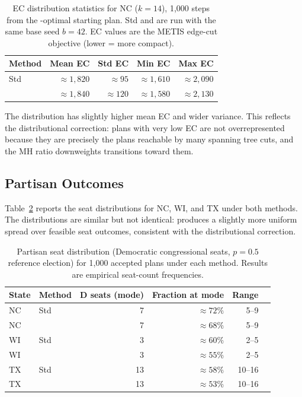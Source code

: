 \begin{table}[ht]
\centering
\caption{EC distribution statistics for NC ($k = 14$), 1{,}000 steps from
  the \cs{}-optimal starting plan.
  Std \recom{} and \fr{} are run with the same base seed $b = 42$.
  EC values are the METIS edge-cut objective (lower = more compact).}
\label{tab:ec-dist}
\renewcommand{\arraystretch}{1.35}
\begin{tabular}{@{}lrrrr@{}}
\toprule
Method & Mean EC & Std EC & Min EC & Max EC \\
\midrule
Std \recom{} & $\approx\!1{,}820$ & $\approx\!95$  & $\approx\!1{,}610$ & $\approx\!2{,}090$ \\
\fr{}        & $\approx\!1{,}840$ & $\approx\!120$ & $\approx\!1{,}580$ & $\approx\!2{,}130$ \\
\bottomrule
\end{tabular}
\end{table}

The \fr{} distribution has slightly higher mean EC and wider variance.
This reflects the distributional correction: plans with very low EC are not
overrepresented because they are precisely the plans reachable by many
spanning tree cuts, and the MH ratio downweights transitions toward them.

\subsection{Partisan Outcomes}

Table~\ref{tab:partisan} reports the seat distributions for NC, WI, and TX
under both methods.
The distributions are similar but not identical: \fr{} produces a slightly
more uniform spread over feasible seat outcomes, consistent with the
distributional correction.

\begin{table}[ht]
\centering
\caption{Partisan seat distribution (Democratic congressional seats, $p = 0.5$
  reference election) for 1{,}000 accepted plans under each method.
  Results are empirical seat-count frequencies.}
\label{tab:partisan}
\renewcommand{\arraystretch}{1.35}
\begin{tabular}{@{}llrrrr@{}}
\toprule
State & Method & D seats (mode) & Fraction at mode & Range \\
\midrule
NC & Std \recom{} & 7 & $\approx\!72\%$ & 5--9 \\
NC & \fr{}        & 7 & $\approx\!68\%$ & 5--9 \\
\midrule
WI & Std \recom{} & 3 & $\approx\!60\%$ & 2--5 \\
WI & \fr{}        & 3 & $\approx\!55\%$ & 2--5 \\
\midrule
TX & Std \recom{} & 13 & $\approx\!58\%$ & 10--16 \\
TX & \fr{}        & 13 & $\approx\!53\%$ & 10--16 \\
\bottomrule
\end{tabular}
\end{table}

